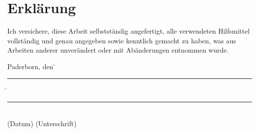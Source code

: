\chapter*{Erklärung}
Ich versichere, diese Arbeit selbstständig angefertigt, alle verwendeten Hilfsmittel vollständig und genau angegeben sowie kenntlich gemacht zu haben, was aus Arbeiten anderer unverändert oder mit Abänderungen entnommen wurde.

\vspace{1cm}
\begin{tabbing}
    Paderborn, den\hspace{3mm}
        \= \rule[-0.15\baselineskip]{3cm}{.4pt} \hspace{3mm}
        \= \rule[-0.15\baselineskip]{6.3cm}{.4pt}\\
    \>\footnotesize{(Datum)}    \>\footnotesize{(Unterschrift)}
\end{tabbing}
